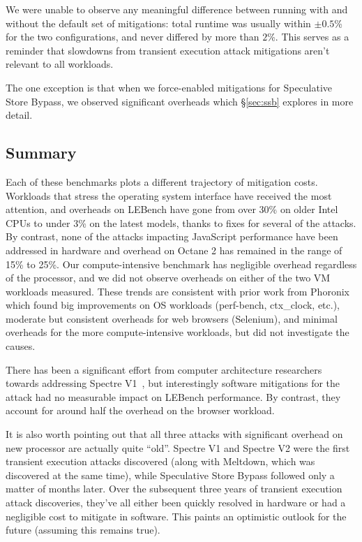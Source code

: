We were unable to observe any meaningful difference between running with and without the default set of mitigations: total runtime was usually within $\pm0.5$\% for the two configurations, and never differed by more than $2$\%.
This serves as a reminder that slowdowns from transient execution attack mitigations aren't relevant to all workloads.

The one exception is that when we force-enabled mitigations for Speculative Store Bypass, we observed significant overheads which \S\ref{sec:ssb} explores in more detail.

\subsection{Summary}
Each of these benchmarks plots a different trajectory of mitigation costs.
Workloads that stress the operating system interface have received the most attention, and overheads on LEBench have gone from over 30\% on older Intel CPUs to under 3\% on the latest models, thanks to fixes for several of the attacks.
By contrast, none of the attacks impacting JavaScript performance have been addressed in hardware and overhead on Octane 2 has remained in the range of 15\% to 25\%.
Our compute-intensive benchmark has negligible overhead regardless of the processor, and we did not observe overheads on either of the two VM workloads measured.
These trends are consistent with prior work from Phoronix~\cite{phoronix:three-years} which found big improvements on OS workloads (perf-bench, ctx\_clock, etc.), moderate but consistent overheads for web browsers (Selenium), and minimal overheads for the more compute-intensive workloads, but did not investigate the causes.

There has been a significant effort from computer architecture researchers towards addressing Spectre V1~\cite{barber:specshield, weisse:nda, ainsworth:muontrap,yu:stt,yu:sdo}, but interestingly software mitigations for the attack had no measurable impact on LEBench performance.
By contrast, they account for around half the overhead on the browser workload.

It is also worth pointing out that all three attacks with significant overhead on new processor are actually quite ``old''.
Spectre V1 and Spectre V2 were the first transient execution attacks discovered (along with Meltdown, which was discovered at the same time), while Speculative Store Bypass followed only a matter of months later.
Over the subsequent three years of transient execution attack discoveries, they've all either been quickly resolved in hardware or had a negligible cost to mitigate in software.
This paints an optimistic outlook for the future (assuming this remains true).
